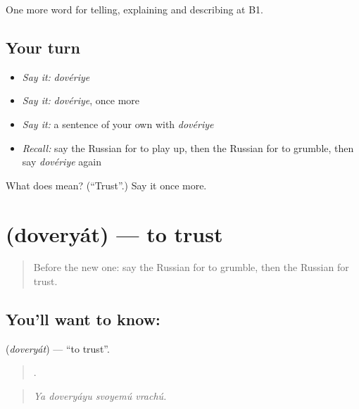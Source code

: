 \begin{grammarlens}[title={What you've built}]
One more word for telling, explaining and describing at B1.
\end{grammarlens}

\subsection*{Your turn}
\begin{itemize}
\raggedright
  \item \emph{Say it:} \emph{dovériye}
  \item \emph{Say it:} \emph{dovériye}, once more
  \item \emph{Say it:} a sentence of your own with \emph{dovériye}
  \item \emph{Recall:} say the Russian for to play up, then the Russian for to grumble, then say \emph{dovériye} again
\end{itemize}

\begin{tcolorbox}[breakable,colback=teal!4,colframe=teal!35!black,title={Before you move on}]
What does  mean? (\textquotedblleft{}Trust\textquotedblright{}.) Say it once more.
\end{tcolorbox}
\section[\texorpdfstring{\ru{доверять} (doveryát)}{доверять (doveryát)}]{ (doveryát) — to trust}

\label{lesson:RU-C479-doveryat}



\begin{quote}
Before the new one: say the Russian for to grumble, then the Russian for trust.
\end{quote}

\subsection*{You'll want to know: }
\textbf{} (\emph{doveryát}) — \textquotedblleft{}to trust\textquotedblright{}.

\begin{quote}
   .
\end{quote}

\begin{quote}
\emph{Ya doveryáyu svoyemú vrachú.}
\end{quote}


